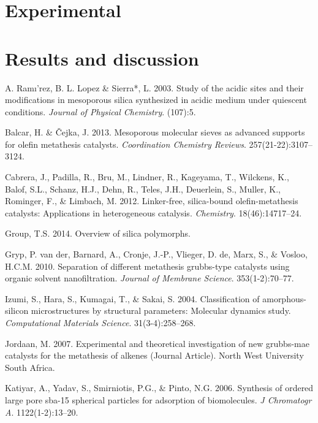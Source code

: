 \documentclass[]{article}
\begin{document}
\hypertarget{experimental}{%
\section{Experimental}\label{experimental}}

\hypertarget{results-and-discussion}{%
\section{Results and discussion}\label{results-and-discussion}}

\listoffigures

\hypertarget{refs}{}
\leavevmode\hypertarget{ref-RN75}{}%
A. Ramı'rez, B. L. Lopez \& Sierra*, L. 2003. Study of the acidic sites
and their modifications in mesoporous silica synthesized in acidic
medium under quiescent conditions. \emph{Journal of Physical Chemistry}.
(107):5.

\leavevmode\hypertarget{ref-RN44}{}%
Balcar, H. \& Čejka, J. 2013. Mesoporous molecular sieves as advanced
supports for olefin metathesis catalysts. \emph{Coordination Chemistry
Reviews}. 257(21-22):3107--3124.

\leavevmode\hypertarget{ref-RN84}{}%
Cabrera, J., Padilla, R., Bru, M., Lindner, R., Kageyama, T., Wilckens,
K., Balof, S.L., Schanz, H.J., Dehn, R., Teles, J.H., Deuerlein, S.,
Muller, K., Rominger, F., \& Limbach, M. 2012. Linker-free, silica-bound
olefin-metathesis catalysts: Applications in heterogeneous catalysis.
\emph{Chemistry}. 18(46):14717--24.

\leavevmode\hypertarget{ref-Rep1}{}%
Group, T.S. 2014. Overview of silica polymorphs.

\leavevmode\hypertarget{ref-RN73}{}%
Gryp, P. van der, Barnard, A., Cronje, J.-P., Vlieger, D. de, Marx, S.,
\& Vosloo, H.C.M. 2010. Separation of different metathesis grubbs-type
catalysts using organic solvent nanofiltration. \emph{Journal of
Membrane Science}. 353(1-2):70--77.

\leavevmode\hypertarget{ref-RN96}{}%
Izumi, S., Hara, S., Kumagai, T., \& Sakai, S. 2004. Classification of
amorphous-silicon microstructures by structural parameters: Molecular
dynamics study. \emph{Computational Materials Science}.
31(3-4):258--268.

\leavevmode\hypertarget{ref-RN88}{}%
Jordaan, M. 2007. Experimental and theoretical investigation of new
grubbs-mae catalysts for the metathesis of alkenes (Journal Article).
North West University South Africa.

\leavevmode\hypertarget{ref-RN89}{}%
Katiyar, A., Yadav, S., Smirniotis, P.G., \& Pinto, N.G. 2006. Synthesis
of ordered large pore sba-15 spherical particles for adsorption of
biomolecules. \emph{J Chromatogr A}. 1122(1-2):13--20.
\end{document}
